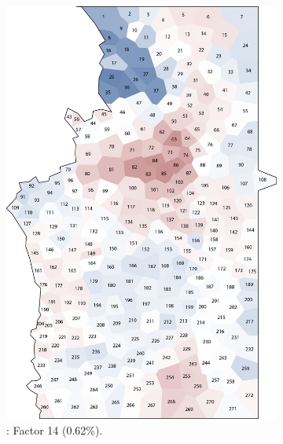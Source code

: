 \documentclass[output=paper]{LSP/langsci}
\begin{document}
\begin{figure}
\begin{subfigure}[t]{0.3\textwidth}
\includegraphics[width=\textwidth]{illustrations/pickl_fig16}
\caption{: Factor 14 (0.62\%).}
\label{fig:pickl:16}
\end{subfigure}  
~
\begin{subfigure}[t]{0.3\textwidth}

\end{subfigure}
\end{figure}
\end{document}
